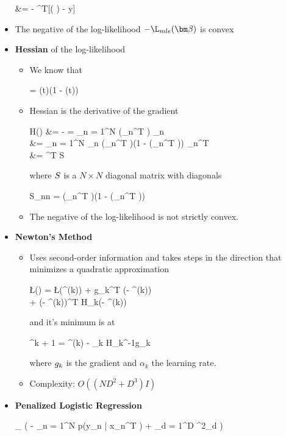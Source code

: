 \begin{itemize}
\begin{myalign*}
	    &= - ^T[\sigma( \bm \beta) - \*y]
	\end{myalign*}
	\item The negative of the log-likelihood $- \L_{mle}(\bm \beta)$ is convex
	\item \textbf{Hessian} of the log-likelihood
	\begin{itemize}
		\item We know that
		\begin{myalign*}
		     = \sigma(t)(1 - \sigma(t))
		\end{myalign*}
		\item Hessian is the derivative of the gradient
		\begin{myalign*}
		    \*H(\bm \beta) &= -   = \sum_{n = 1}^N  \sigma(_n^T \bm \beta) \tilde{\*x}_n\\
		    &= \sum_{n = 1}^N _n \sigma(_n^T \bm \beta)(1 - \sigma(_n^T \bm \beta)) _n^T\\
		    &= ^T \*S \tilde{\*X}
		\end{myalign*}
		where $\*S$ is a $N \times N$ diagonal matrix with diagonals
		\begin{myalign*}
		    S_{nn} = \sigma(_n^T \bm \beta)(1 - \sigma(_n^T \bm \beta))
		\end{myalign*}
		\item The negative of the log-likelihood is not strictly convex.
	\end{itemize}
	\item \textbf{Newton's Method} %
	\begin{itemize}
		\item Uses second-order information and takes steps in the direction that minimizes a quadratic approximation
		\begin{myalign*}
		    \L(\bm \beta) = \L(\bm \beta^{(k)}) + \*g_k^T (\bm \beta - \bm \beta^{(k)})\\ + (\bm \beta - \bm \beta^{(k)})^T \*H_k(\bm \beta - \bm \beta^{(k)})
		\end{myalign*}
		and it's minimum is at
		\begin{myalign*}
		    \bm \beta^{k + 1} = \bm \beta^{(k)} - \alpha_k \*H_k^{-1}\*g_k
		\end{myalign*}
		where $\*g_k$ is the gradient and $\alpha_k$ the learning rate.
		\item Complexity: $O((ND^2 + D^3)I)$
	\end{itemize}
	\item \textbf{Penalized Logistic Regression}
	\begin{myalign*}
	    \min_{\bm \beta} 
	    \left(
	    	- \sum_{n = 1}^N \log p(y_n | \*x_n^T \bm \beta) + \lambda \sum_{d = 1}^D \beta^2_d
	    \right)
	\end{myalign*}
\end{itemize}

